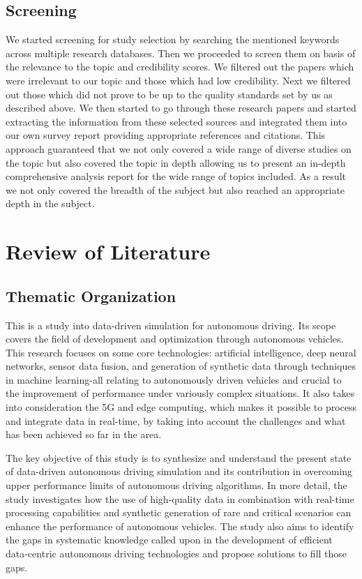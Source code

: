 \documentclass[lettersize,journal]{IEEEtran}
\begin{document}
\subsection{Screening}
We started screening for study selection by searching the mentioned keywords across multiple research databases.
Then we proceeded to screen them on basis of the relevance to the topic and credibility scores. We filtered out
the papers which were irrelevant to our topic and those which had low credibility. Next we filtered out those which
did not prove to be up to the quality standards set by us as described above. We then started to go through these
research papers and started extracting the information from these selected sources and integrated them into our own
survey report providing appropriate references and citations.
This approach guaranteed that we not only covered a wide range of diverse studies on the topic but also covered the
topic in depth allowing us to present an in-depth comprehensive analysis report for the wide range of topics included.
As a result we not only covered the breadth of the subject but also reached an appropriate depth in the subject.







\section{Review of Literature}
\subsection{Thematic Organization}
This is a study into data-driven simulation for autonomous driving. Its scope covers the field of development and optimization through autonomous vehicles. This research focuses on some core technologies: artificial intelligence, deep neural networks, sensor data fusion, and generation of synthetic data through techniques in machine learning-all relating to autonomously driven vehicles and crucial to the improvement of performance under variously complex situations. It also takes into consideration the 5G and edge computing, which makes it possible to process and integrate data in real-time, by taking into account the challenges and what has been achieved so far in the area.

The key objective of this study is to synthesize and understand the present state of data-driven autonomous driving simulation and its contribution in overcoming upper performance limits of autonomous driving algorithms. In more detail, the study investigates how the use of high-quality data in combination with real-time processing capabilities and synthetic generation of rare and critical scenarios can enhance the performance of autonomous vehicles. The study also aims to identify the gaps in systematic knowledge called upon in the development of efficient data-centric autonomous driving technologies and propose solutions to fill those gaps.
\\
\end{document}
